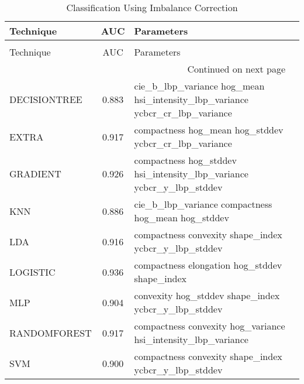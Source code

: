 \begin{longtable}{lcll}
\caption[Classification Using Imbalance Correction]{Classification Using Imbalance Correction}
\label{table:results-corrected}\\
\toprule
   Technique &   AUC &                                                                   Parameters \\
\midrule
\endfirsthead
\caption[]{Classification Using Imbalance Correction} \\
\toprule
   Technique &   AUC &                                                                   Parameters \\
\midrule
\endhead
\midrule
\multicolumn{3}{r}{{Continued on next page}} \\
\midrule
\endfoot

\bottomrule
\endlastfoot
DECISIONTREE & 0.883 & cie\_b\_lbp\_variance hog\_mean hsi\_intensity\_lbp\_variance ycbcr\_cr\_lbp\_variance \\
       EXTRA & 0.917 &                        compactness hog\_mean hog\_stddev ycbcr\_cr\_lbp\_variance \\
    GRADIENT & 0.926 &         compactness hog\_stddev hsi\_intensity\_lbp\_variance ycbcr\_y\_lbp\_stddev \\
         KNN & 0.886 &                           cie\_b\_lbp\_variance compactness hog\_mean hog\_stddev \\
         LDA & 0.916 &                         compactness convexity shape\_index ycbcr\_y\_lbp\_stddev \\
    LOGISTIC & 0.936 &                                compactness elongation hog\_stddev shape\_index \\
         MLP & 0.904 &                          convexity hog\_stddev shape\_index ycbcr\_y\_lbp\_stddev \\
RANDOMFOREST & 0.917 &                compactness convexity hog\_variance hsi\_intensity\_lbp\_variance \\
         SVM & 0.900 &                         compactness convexity shape\_index ycbcr\_y\_lbp\_stddev \\
\end{longtable}
